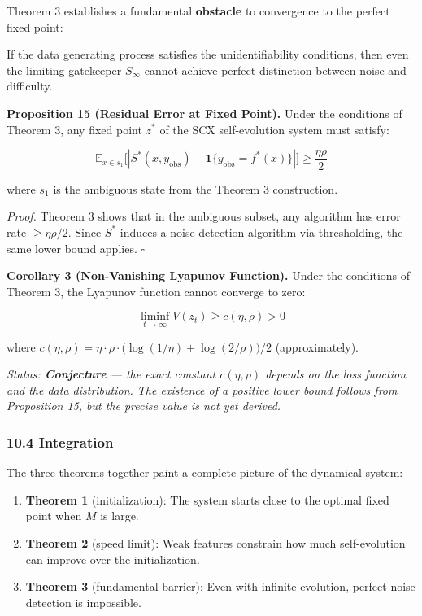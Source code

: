 \documentclass[
  12pt,
]{ctexart}
\providecommand{\tightlist}{%
  \setlength{\itemsep}{0pt}\setlength{\parskip}{0pt}}
\begin{document}
Theorem 3 establishes a fundamental \textbf{obstacle} to convergence to
the perfect fixed point:

If the data generating process satisfies the unidentifiability
conditions, then even the limiting gatekeeper \(S_\infty\) cannot
achieve perfect distinction between noise and difficulty.

\textbf{Proposition 15 (Residual Error at Fixed Point).} Under the
conditions of Theorem 3, any fixed point \(z^*\) of the SCX
self-evolution system must satisfy:

\[\mathbb{E}_{x \in s_1}\bigl[ |S^*(x, y_{\text{obs}}) - \mathbf{1}\{y_{\text{obs}} = f^*(x)\}| \bigr] \geq \frac{\eta\rho}{2}\]

where \(s_1\) is the ambiguous state from the Theorem 3 construction.

\emph{Proof.} Theorem 3 shows that in the ambiguous subset, any
algorithm has error rate \(\geq \eta\rho/2\). Since \(S^*\) induces a
noise detection algorithm via thresholding, the same lower bound
applies. \(\square\)

\textbf{Corollary 3 (Non-Vanishing Lyapunov Function).} Under the
conditions of Theorem 3, the Lyapunov function cannot converge to zero:

\[\liminf_{t \to \infty} V(z_t) \geq c(\eta, \rho) > 0\]

where
\(c(\eta, \rho) = \eta \cdot \rho \cdot \bigl( \log(1/\eta) + \log(2/\rho) \bigr) / 2\)
(approximately).

\emph{Status: \textbf{Conjecture} --- the exact constant
\(c(\eta, \rho)\) depends on the loss function and the data
distribution. The existence of a positive lower bound follows from
Proposition 15, but the precise value is not yet derived.}

\subsubsection{10.4 Integration}\label{integration}

The three theorems together paint a complete picture of the dynamical
system:

\begin{enumerate}
\def\labelenumi{\arabic{enumi}.}
\tightlist
\item
  \textbf{Theorem 1} (initialization): The system starts close to the
  optimal fixed point when \(M\) is large.
\item
  \textbf{Theorem 2} (speed limit): Weak features constrain how much
  self-evolution can improve over the initialization.
\item
  \textbf{Theorem 3} (fundamental barrier): Even with infinite
  evolution, perfect noise detection is impossible.
\end{enumerate}
\end{document}
